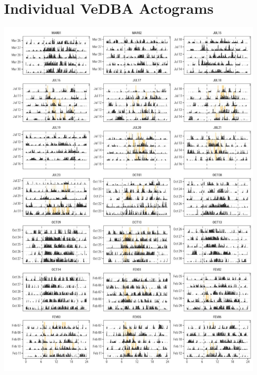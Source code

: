\documentclass[english,msc,numbers,hidelinks]{coppe}
\begin{document}
  \hypertarget{individual-vedba-actograms}{%
  \chapter{Individual VeDBA Actograms}\label{individual-vedba-actograms}}
  \begin{center}\includegraphics[width=0.95\linewidth]{../04_figures/actograms/actograms_vedba} \end{center}
\end{document}
